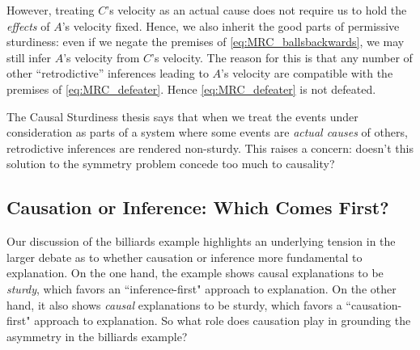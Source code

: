 \documentclass[natbib]{svjour3}                     %
\begin{document}
However, treating $C$'s velocity as an actual cause does not require us to hold the \textit{effects} of $A$'s velocity fixed. Hence, we also inherit the good parts of permissive sturdiness: even if we negate the premises of \ref{eq:MRC_ballsbackwards}, we may still infer $A$'s velocity from $C$'s velocity.  The reason for this is that any number of other ``retrodictive'' inferences leading to $A$'s velocity are compatible with the premises of \ref{eq:MRC_defeater}. Hence \ref{eq:MRC_defeater} is not defeated.  

The Causal Sturdiness thesis says that when we treat the events under consideration as parts of a system where some events are \textit{actual causes} of others, retrodictive inferences are rendered non-sturdy.  This raises a concern: doesn't this solution to the symmetry problem concede too much to causality?



\subsection{Causation or Inference: Which Comes First?}
\label{subsec:fundamental}

Our discussion of the billiards example highlights an underlying tension in the larger debate as to whether causation or inference more fundamental to explanation. On the one hand, the example shows causal explanations to be \textit{sturdy}, which favors an ``inference-first" approach to explanation. On the other hand, it also shows \textit{causal} explanations to be sturdy, which favors a ``causation-first" approach to explanation. So what role does causation play in grounding the asymmetry in the billiards example? 

\end{document}
